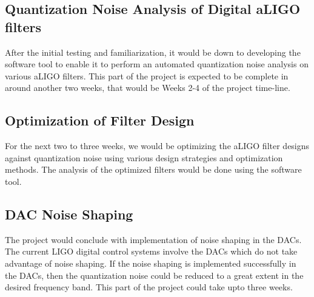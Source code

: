 \documentclass[colorlinks=true,pdfstartview=FitV,linkcolor=blue,
            citecolor=red,urlcolor=magenta]{ligodoc}
\begin{document}
\subsection{Quantization Noise Analysis of Digital aLIGO filters} After the initial testing and familiarization, it would be down to developing the software tool to enable it to perform an automated quantization noise analysis on various aLIGO filters. This part of the project is expected to be complete in around another two weeks, that would be Weeks 2-4 of the project time-line.
\subsection{Optimization of Filter Design}For the next two to three weeks, we would be optimizing the aLIGO filter designs against quantization noise using various design strategies and optimization methods. The analysis of the optimized filters would be done using the software tool.
\subsection{DAC Noise Shaping}The project would conclude with implementation of noise shaping in the DACs. The current LIGO digital control systems involve the DACs which do not take advantage of noise shaping. If the noise shaping is implemented successfully in the DACs, then the quantization noise could be reduced to a great extent in the desired frequency band. This part of the project could take upto three weeks.
\end{document}
